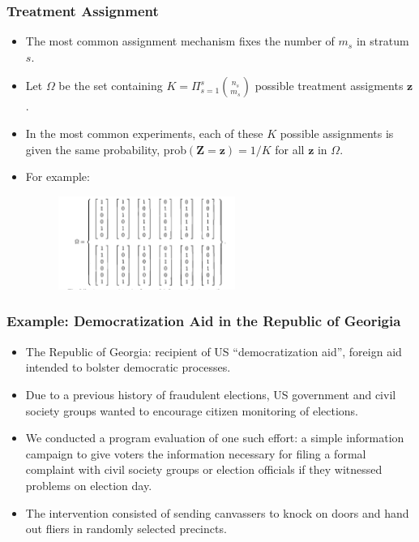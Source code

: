 \documentclass{beamer}
\begin{document}
\begin{frame}[c]\frametitle{Treatment Assignment}
	\begin{itemize}
		\item<+-> The most common assignment mechanism fixes the number of $m_s$ in
		stratum $s$.
		\item<+-> Let $\Omega$ be the set containing $K= \Pi_{s=1}^s 
		{n_s\choose m_s}$ possible treatment assigments $\mathbf{z}$.
		\item<+-> In the most common
		experiments, each of these $K$ possible assignments is given the same
		probability, prob$(\mathbf{Z}=\mathbf{z})=1/K$ for all $\mathbf{z}$ in
		$\Omega$.
		\item<+-> For example:
		\begin{figure}[htbp]
			\centering
				\includegraphics[height=1.2in]{omega.png}
			\label{fig:omega}
		\end{figure}		
	\end{itemize}	
\end{frame}

\begin{frame}[t]\frametitle{Example: Democratization Aid in the Republic of Georigia}
	\begin{itemize}
		\item<+-> The Republic of Georgia: recipient of US ``democratization aid'', foreign aid intended to bolster democratic processes. 
		\item<+-> Due to a previous history of fraudulent elections, US government and civil society groups wanted to encourage citizen monitoring of elections. 
		\item<+-> We conducted a program evaluation of one such
		effort: a simple information campaign to give voters the
		information necessary for filing a formal complaint with civil society
		groups or election officials if they witnessed problems on
		election day.
		\item<+->  The intervention consisted of sending canvassers to knock on
		doors and hand out fliers  in randomly selected precincts.
	\end{itemize}
\end{frame}
\end{document}
